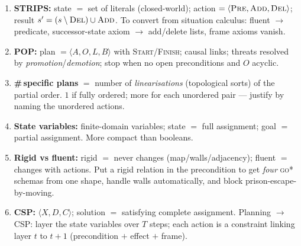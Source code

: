 \documentclass[11pt,a4paper]{article}
\newcommand{\pred}[1]{\textsc{#1}}
\newcommand{\add}{\textsc{Add}}
\newcommand{\del}{\textsc{Del}}
\newcommand{\pre}{\textsc{Pre}}
\begin{document}
\begin{tcolorbox}[colback=gray!5,colframe=gray!50!black,breakable]
\begin{enumerate}[leftmargin=*,itemsep=2pt]
  \item \textbf{STRIPS:} state $=$ set of literals (closed-world); action $=\langle\pre,\add,\del\rangle$; result $s'=(s\setminus\del)\cup\add$. To convert from situation calculus: fluent $\to$ predicate, successor-state axiom $\to$ add/delete lists, frame axioms vanish.
  \item \textbf{POP:} plan $=\langle A,O,L,B\rangle$ with \pred{Start}/\pred{Finish}; causal links; threats resolved by \emph{promotion}/\emph{demotion}; stop when no open preconditions and $O$ acyclic.
  \item \textbf{\#\,specific plans} $=$ number of \emph{linearisations} (topological sorts) of the partial order. $1$ if fully ordered; more for each unordered pair --- justify by naming the unordered actions.
  \item \textbf{State variables:} finite-domain variables; state $=$ full assignment; goal $=$ partial assignment. More compact than booleans.
  \item \textbf{Rigid vs fluent:} rigid $=$ never changes (map/walls/adjacency); fluent $=$ changes with actions. Put a rigid relation in the precondition to get \emph{four} \pred{go*} schemas from one shape, handle walls automatically, and block prison-escape-by-moving.
  \item \textbf{CSP:} $\langle X,D,C\rangle$; solution $=$ satisfying complete assignment. Planning $\to$ CSP: layer the state variables over $T$ steps; each action is a constraint linking layer $t$ to $t{+}1$ (precondition $+$ effect $+$ frame).
\end{enumerate}
\end{tcolorbox}
\end{document}
